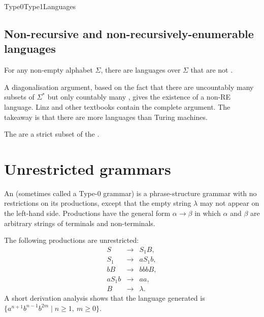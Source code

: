 \documentclass[hidelinks]{article}
\begin{document}
\begin{smodule}[title={Type 0 and Type 1 Languages and their Automata}]{Type0Type1Languages}
\subsection{Non-recursive and non-recursively-enumerable languages}

\begin{sparagraph}[title={Theorem: not every language is recursively enumerable}]
For any non-empty alphabet $\Sigma$, there are languages over $\Sigma$ that are not .
\end{sparagraph}

\begin{sparagraph}[title={Proof sketch}]
A diagonalisation argument, based on the fact that there are uncountably many subsets of $\Sigma^*$ but only countably many , gives the existence of a non-RE language. Linz and other textbooks contain the complete argument. The takeaway is that there are more languages than Turing machines.
\end{sparagraph}

\begin{sparagraph}[title={Theorem: recursive $\subsetneq$ recursively enumerable}]
The  are a strict subset of the .
\end{sparagraph}

\section{Unrestricted grammars}

\begin{sdefinition}[for=unrestricted grammar]
An  (sometimes called a Type-0 grammar) is a phrase-structure grammar with no restrictions on its productions, except that the empty string $\lambda$ may not appear on the left-hand side. Productions have the general form $\alpha \to \beta$ in which $\alpha$ and $\beta$ are arbitrary strings of terminals and non-terminals.
\end{sdefinition}

\begin{example}
The following productions are unrestricted:
\[
\begin{array}{rcl}
S &\to& S_1 B,\\
S_1 &\to& a S_1 b,\\
b B &\to& b b b B,\\
a S_1 b &\to& a a,\\
B &\to& \lambda.
\end{array}
\]
A short derivation analysis shows that the language generated is $\{a^{n+1} b^{n-1} b^{2m} \mid n \geq 1,\ m \geq 0\}$.
\end{example}


\end{smodule}
\end{document}
